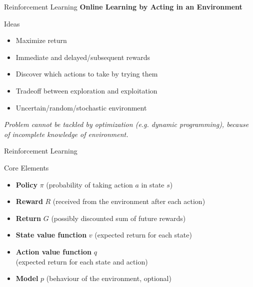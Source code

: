 \documentclass[ignorenonframetext,xcolor=x11names]{beamer}
\begin{document}
\begin{frame}{Reinforcement Learning}
\centering  \textbf{Online Learning by Acting in an Environment}
\vspace{\baselineskip}  
\begin{block}{Ideas}
\begin{itemize}
   \item Maximize return
   \item Immediate and delayed/subsequent rewards
   \item Discover which actions to take by trying them
   \item Tradeoff between exploration and exploitation
   \item Uncertain/random/stochastic environment
\end{itemize}
\end{block} 
\vspace{\baselineskip} \centering
\emph{Problem cannot be tackled by optimization (e.g. dynamic programming), because of incomplete knowledge of environment.}
\end{frame}

\begin{frame}{Reinforcement Learning}
\begin{block}{Core Elements}
\begin{itemize}
    \item \textbf{Policy} $\pi$ (probability of taking action $a$ in state $s$)
    \item \textbf{Reward} $R$ (received from the environment after each action)
    \item \textbf{Return} $G$ (possibly discounted sum of future rewards)
    \item \textbf{State value function} $v$ (expected return for each state)
    \item \textbf{Action value function} $q$ \\ (expected return for each state and action)
    \item \textbf{Model} $p$ (behaviour of the environment, optional)
\end{itemize}
\end{block}
\end{frame}
\end{document}
